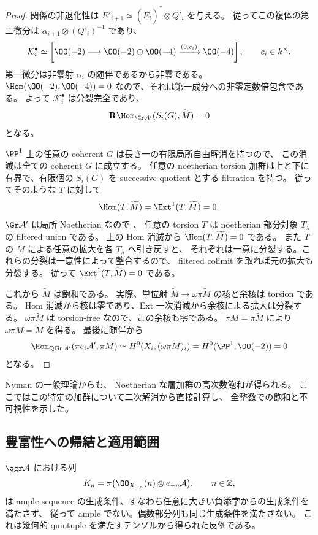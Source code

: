 \begin{proof}
関係の非退化性は
$E'_{i+1}\simeq(E_i^\prime)^*\otimes Q'_i$ を与える。
従ってこの複体の第二微分は
$\alpha_{i+1}\otimes(Q'_i)^{-1}$ であり、
\[
 \mathcal K_i^\bullet\simeq
 \left[
 \OO(-2)\longrightarrow\OO(-2)\oplus\OO(-4)
 \xrightarrow{(0,c_i)}\OO(-4)
 \right],\qquad c_i\in k^\times.
\]
第一微分は非零射 $\alpha_i$ の随伴であるから非零である。
$\Hom(\OO(-2),\OO(-4))=0$ なので、それは第一成分への非零定数倍包含である。
よって $\mathcal K_i^\bullet$ は分裂完全であり、
\[
 \mathbf R\Hom_{\Gr\mathcal A'}(S_i(G),\widetilde M)=0
\]
となる。

$\PP^1$ 上の任意の coherent $G$ は長さ一の有限局所自由解消を持つので、
この消滅は全ての coherent $G$ に成立する。
任意の noetherian torsion 加群は上と下に有界で、有限個の
$S_i(G)$ を successive quotient とする filtration を持つ。
従ってそのような $T$ に対して
\[
 \Hom(T,\widetilde M)=\Ext^1(T,\widetilde M)=0.
\]
$\Gr\mathcal A'$ は局所 Noetherian なので \cite[Theorem 1.2]{VanDenBergh2012P1}、
任意の torsion $T$ は noetherian 部分対象 $T_\lambda$ の filtered union である。
上の Hom 消滅から $\Hom(T,\widetilde M)=0$ である。
また $T$ の $\widetilde M$ による任意の拡大を各 $T_\lambda$ へ引き戻すと、
それぞれは一意に分裂する。これらの分裂は一意性によって整合するので、
filtered colimit を取れば元の拡大も分裂する。
従って $\Ext^1(T,\widetilde M)=0$ である。

これから $\widetilde M$ は飽和である。
実際、単位射 $\widetilde M\to\omega\pi\widetilde M$ の核と余核は torsion である。
Hom 消滅から核は零であり、Ext 一次消滅から余核による拡大は分裂する。
$\omega\pi\widetilde M$ は torsion-free なので、この余核も零である。
$\pi M=\pi\widetilde M$ により $\omega\pi M=\widetilde M$ を得る。
最後に随伴から
\[
 \Hom_{\operatorname{QGr}\mathcal A'}(\pi e_i\mathcal A',\pi M)
 \simeq H^0(X_i,(\omega\pi M)_i)
 =H^0(\PP^1,\OO(-2))=0
\]
となる。
\end{proof}

Nyman \cite[Theorem 2.5, Corollary 3.3]{Nyman2004} の一般理論からも、
Noetherian な層加群の高次数飽和が得られる。
ここではこの特定の加群について二次解消から直接計算し、
全整数での飽和と不可視性を示した。

\subsection{豊富性への帰結と適用範囲}

\begin{theorem}\label{ruled-thm:nonample}
$\qgr\mathcal A$ における列
\[
 K_n=\pi\bigl(\OO_{X_{-n}}(n)\otimes e_{-n}\mathcal A\bigr),\qquad n\in\mathbb Z,
\]
は ample sequence の生成条件、すなわち任意に大きい負添字からの生成条件を満たさず、
従って ample でない。偶数部分列も同じ生成条件を満たさない。
これは幾何的 quintuple を満たすテンソルから得られた反例である。
\end{theorem}

